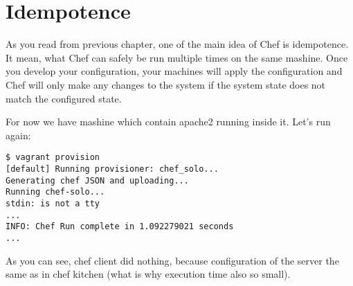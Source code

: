 \section{Idempotence}
\label{sec:solo-idempotence}

As you read from previous chapter, one of the main idea of Chef is idempotence. It mean, what Chef can safely be run multiple times on the same mashine. Once you develop your configuration, your machines will apply the configuration and Chef will only make any changes to the system if the system state does not match the configured state.

For now we have mashine which contain apache2 running inside it. Let's run  again:

\begin{lstlisting}[label=lst:my-cloud-idempotence1]
$ vagrant provision
[default] Running provisioner: chef_solo...
Generating chef JSON and uploading...
Running chef-solo...
stdin: is not a tty
...
INFO: Chef Run complete in 1.092279021 seconds
...
\end{lstlisting}

As you can see, chef client did nothing, because configuration of the server the same as in chef kitchen (what is why execution time also so small).
